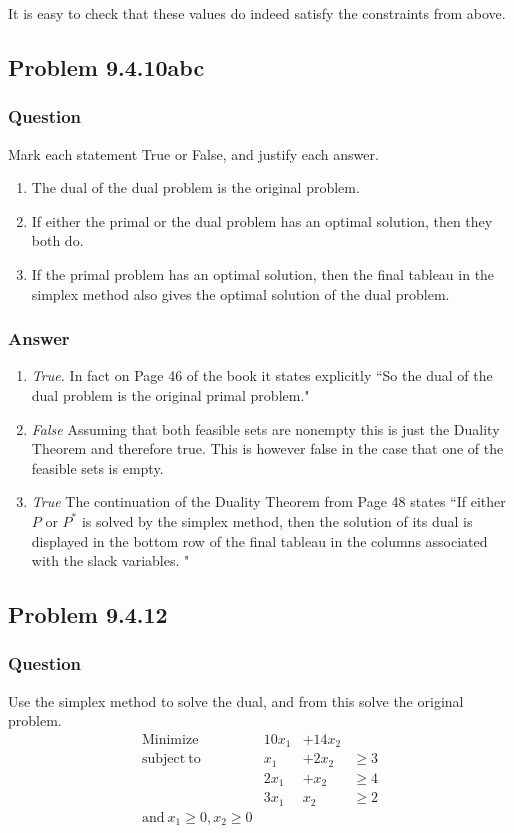 \documentclass[12pt]{article}
\begin{document}
It is easy to check that these values do indeed satisfy the constraints from above.

\subsection{Problem 9.4.10abc}
\subsubsection{Question}
Mark each statement True or False, and justify each answer.
\begin{enumerate}
\item The dual of the dual problem is the original problem.
\item If either the primal or the dual problem has an optimal solution, then they both do.
\item If the primal problem has an optimal solution, then the final tableau in the simplex method also gives the optimal solution of the dual problem.
\end{enumerate}
\subsubsection{Answer}
\begin{enumerate}
\item \emph{True.} In fact on Page 46 of the book it states explicitly ``So the dual of the dual problem is the original primal problem."
\item \emph{False} Assuming that both feasible sets are nonempty this is just the Duality Theorem and therefore true. This is however false in the case that one of the feasible sets is empty.
\item \emph{True} The continuation of the Duality Theorem from Page 48 states ``If either $P$ or $P^*$ is solved by the simplex method, then the solution of its dual is displayed in the bottom row of the final tableau in the columns associated with the slack variables. "
\end{enumerate}


\subsection{Problem 9.4.12}
\subsubsection{Question}
Use the simplex method to solve the dual, and from this solve the original problem.
\[
\begin{array}{lrrrr}
\mathrm{Minimize}  &10 x_1  &+ 14 x_2\\
\mathrm{subject\ to} & x_1 &+ 2 x_2 & \geq 3\\
&2 x_1 &+ x_2 &\geq 4\\
& 3x_1 & x_2 & \geq2\\
\mathrm{and\ }x_1\geq0, x_2 \geq 0
\end{array}
\]
\end{document}
